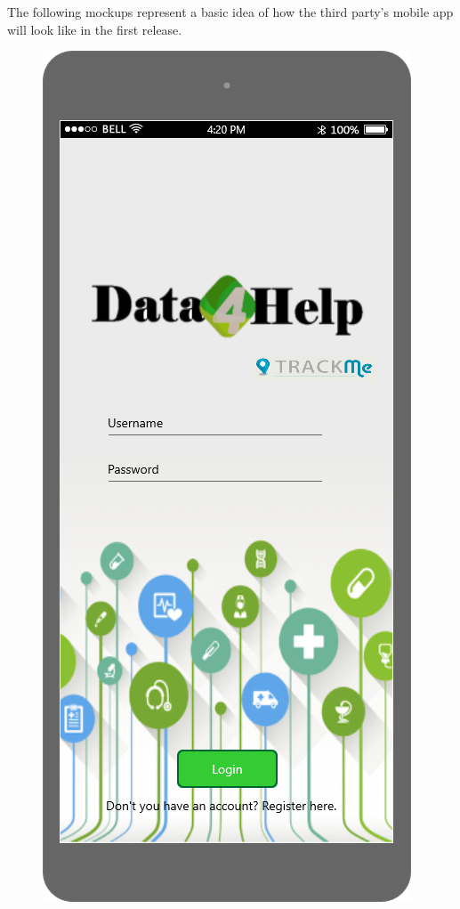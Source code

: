 The following mockups represent a basic idea of how the third party's mobile app will look like in the first 
release. 

\begin{figure}[h!]
	\centering
 	 \begin{minipage}[b]{0.25\textwidth}
    		\includegraphics[width=\textwidth]{./pictures/login_3p.png}

\end{minipage}
\end{figure}
